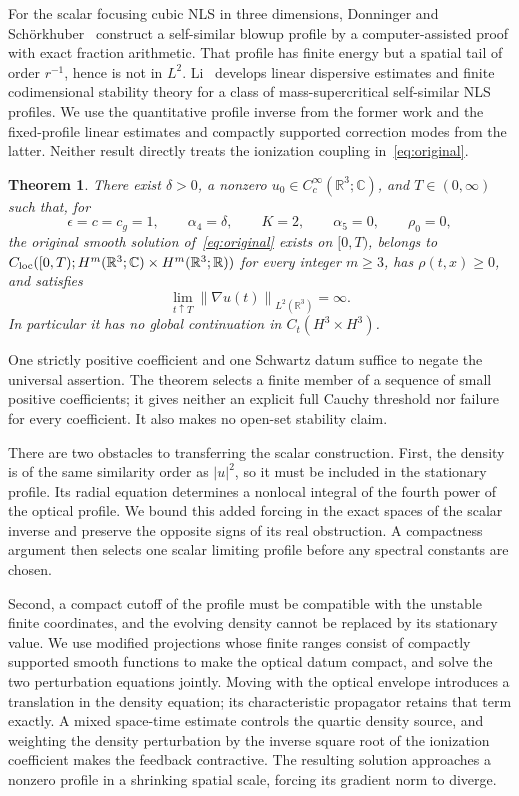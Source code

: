 \documentclass[11pt]{article}
\numberwithin{equation}{section}
\newtheorem{theorem}{Theorem}[section]
\theoremstyle{remark}
\newcommand{\R}{\mathbb R}
\newcommand{\C}{\mathbb C}
\newcommand{\norm}[1]{\left\|#1\right\|}
\newcommand{\eps}{\epsilon}
\begin{document}
For the scalar focusing cubic NLS in three dimensions, Donninger and
Sch\"orkhuber~\cite{DS} construct a self-similar blowup profile by a
computer-assisted proof with exact fraction arithmetic. That profile
has finite energy but a spatial tail of order $r^{-1}$, hence is not in
$L^2$. Li~\cite{Li} develops linear dispersive estimates and finite
codimensional stability theory for a class of mass-supercritical
self-similar NLS profiles. We use the quantitative profile inverse from
the former work and the fixed-profile linear estimates and compactly
supported correction modes from the latter. Neither result directly
treats the ionization coupling in~\eqref{eq:original}.

\begin{theorem}\label{thm:main}
There exist $\delta>0$, a nonzero $u_0\in C_c^\infty(\R^3;\C)$, and
$T\in(0,\infty)$ such that, for
\[
 \eps=c=c_g=1,\qquad \alpha_4=\delta,\qquad K=2,
 \qquad \alpha_5=0,\qquad \rho_0=0,
\]
the original smooth solution of~\eqref{eq:original} exists on $[0,T)$,
belongs to $C_{\rm loc}([0,T);H^m(\R^3;\C)\times H^m(\R^3;\R))$
for every integer $m\ge3$, has $\rho(t,x)\ge0$, and satisfies
\[
 \lim_{t\uparrow T}\norm{\nabla u(t)}_{L^2(\R^3)}=\infty.
\]
In particular it has no global continuation in $C_t(H^3\times H^3)$.
\end{theorem}

One strictly positive coefficient and one Schwartz datum suffice to
negate the universal assertion. The theorem selects a finite member of
a sequence of small positive coefficients; it gives neither an explicit
full Cauchy threshold nor failure for every coefficient. It also makes
no open-set stability claim.

There are two obstacles to transferring the scalar construction. First,
the density is of the same similarity order as $|u|^2$, so it must be
included in the stationary profile. Its radial equation determines a
nonlocal integral of the fourth power of the optical profile. We bound
this added forcing in the exact spaces of the scalar inverse and preserve
the opposite signs of its real obstruction. A compactness argument then
selects one scalar limiting profile before any spectral constants are
chosen.

Second, a compact cutoff of the profile must be compatible with the
unstable finite coordinates, and the evolving density cannot be replaced
by its stationary value. We use modified projections whose finite ranges
consist of compactly supported smooth functions to make the optical datum
compact, and solve the
two perturbation equations jointly. Moving with the optical envelope
introduces a translation in the density equation; its characteristic
propagator retains that term exactly. A mixed space-time estimate controls
the quartic density source, and weighting the density perturbation by
the inverse square root of the ionization coefficient makes the feedback
contractive. The resulting solution approaches a nonzero profile in a
shrinking spatial scale, forcing its gradient norm to diverge.
\end{document}
